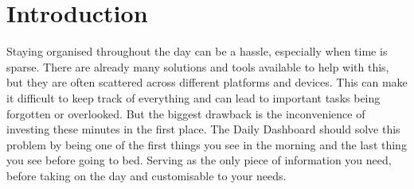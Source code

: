 

\section{Introduction}\label{sec:Introduction}
Staying organised throughout the day can be a hassle, especially when time is sparse.
There are already many solutions and tools available to help with this, but they are often scattered across different platforms and devices. This can make it difficult to keep track of everything and can lead to important tasks being forgotten or overlooked.
But the biggest drawback is the inconvenience of investing these minutes in the first place.
The Daily Dashboard should solve this problem by being one of the first things you see in the morning and the last thing you see before going to bed.
Serving as the only piece of information you need, before taking on the day and customisable to your needs.
